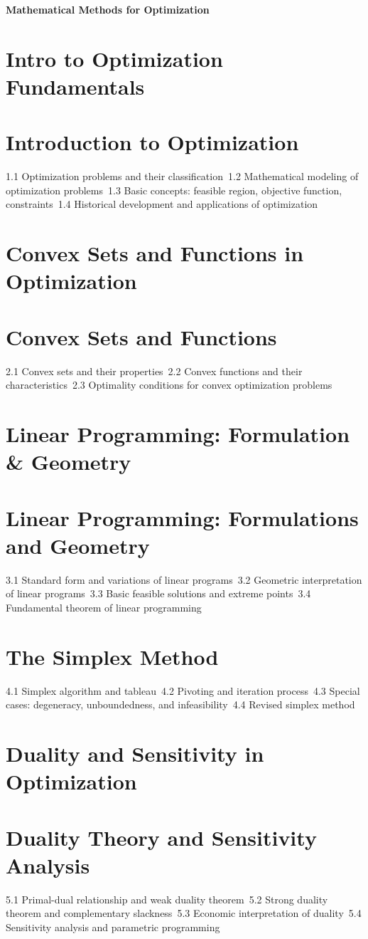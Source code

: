 {\LARGE \bf{Mathematical Methods for Optimization}}
\section{Intro to Optimization Fundamentals}
\section{Introduction to Optimization}
1.1 Optimization problems and their classification\
1.2 Mathematical modeling of optimization problems\
1.3 Basic concepts: feasible region, objective function, constraints\
1.4 Historical development and applications of optimization\
\section{Convex Sets and Functions in Optimization}
\section{Convex Sets and Functions}
2.1 Convex sets and their properties\
2.2 Convex functions and their characteristics\
2.3 Optimality conditions for convex optimization problems\
\section{Linear Programming: Formulation \& Geometry}
\section{Linear Programming: Formulations and Geometry}
3.1 Standard form and variations of linear programs\
3.2 Geometric interpretation of linear programs\
3.3 Basic feasible solutions and extreme points\
3.4 Fundamental theorem of linear programming\
\section{The Simplex Method}
4.1 Simplex algorithm and tableau\
4.2 Pivoting and iteration process\
4.3 Special cases: degeneracy, unboundedness, and infeasibility\
4.4 Revised simplex method\
\section{Duality and Sensitivity in Optimization}
\section{Duality Theory and Sensitivity Analysis}
5.1 Primal-dual relationship and weak duality theorem\
5.2 Strong duality theorem and complementary slackness\
5.3 Economic interpretation of duality\
5.4 Sensitivity analysis and parametric programming\
